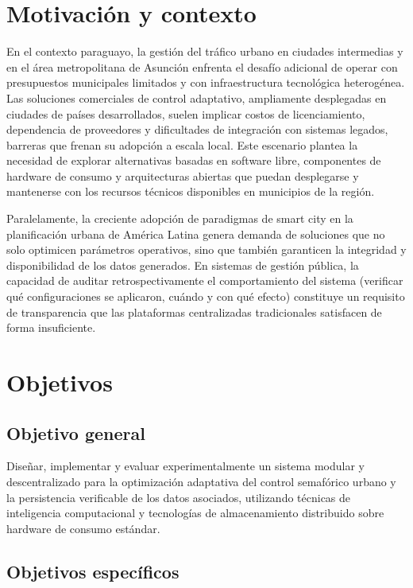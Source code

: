 \section{Motivación y contexto}

En el contexto paraguayo, la gestión del tráfico urbano en ciudades intermedias y en el área
metropolitana de Asunción enfrenta el desafío adicional de operar con presupuestos municipales
limitados y con infraestructura tecnológica heterogénea. Las soluciones comerciales de control
adaptativo, ampliamente desplegadas en ciudades de países desarrollados, suelen implicar costos
de licenciamiento, dependencia de proveedores y dificultades de integración con sistemas
legados, barreras que frenan su adopción a escala local. Este escenario plantea la necesidad
de explorar alternativas basadas en software libre, componentes de hardware de consumo y
arquitecturas abiertas que puedan desplegarse y mantenerse con los recursos técnicos disponibles
en municipios de la región.

Paralelamente, la creciente adopción de paradigmas de smart city en la planificación
urbana de América Latina genera demanda de soluciones que no solo optimicen parámetros
operativos, sino que también garanticen la integridad y disponibilidad de los datos generados.
En sistemas de gestión pública, la capacidad de auditar retrospectivamente el comportamiento
del sistema (verificar qué configuraciones se aplicaron, cuándo y con qué efecto) constituye
un requisito de transparencia que las plataformas centralizadas tradicionales satisfacen de
forma insuficiente.

\section{Objetivos}

\subsection{Objetivo general}

Diseñar, implementar y evaluar experimentalmente un sistema modular y descentralizado para la
optimización adaptativa del control semafórico urbano y la persistencia verificable de los
datos asociados, utilizando técnicas de inteligencia computacional y tecnologías de
almacenamiento distribuido sobre hardware de consumo estándar.

\subsection{Objetivos específicos}

